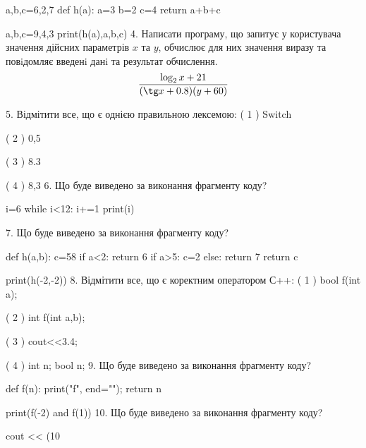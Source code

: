 \documentclass[11pt]{article}
\begin{document}
a,b,c=6,2,7
def h(a):
    a=3
    b=2
    c=4
    return a+b+c

a,b,c=9,4,3
print(h(a),a,b,c)
\vspace{5mm}
4. 
Написати програму, що запитує у користувача значення дійсних параметрів $x$ та $y$, обчислює для них значення виразу та повiдомляє введенi данi та результат обчислення.
$$\frac{\log_{2} x + 21}{(\tg x + 0.8) (y + 60)}$$ 

\vspace{5mm}
5. %
Відмітити все, що є однією правильною лексемою:
( 1 ) Switch

( 2 ) 0,5

( 3 ) 8.3

( 4 ) 8,3
\vspace{5mm}
6. Що буде виведено за виконання фрагменту коду?

i=6
while i<12:
    i+=1
print(i)

\vspace{5mm}
7. Що буде виведено за виконання фрагменту коду?

def h(a,b):
    c=58
    if a<2:
        return 6
    if a>5:
         c=2
    else: 
        return 7
    return c

print(h(-2,-2))
\vspace{5mm}
8. %
Відмітити все, що є коректним оператором С++:
( 1 ) bool f(int a);

( 2 ) int f(int a,b);

( 3 ) cout<<3.4;

( 4 ) int n; bool n;
\vspace{5mm}
9. Що буде виведено за виконання фрагменту коду?

def f(n):
    print("f", end="");
    return n

print(f(-2) and f(1))
\vspace{5mm}
10. Що буде виведено за виконання фрагменту коду?

cout << (10 %
\vspace{5mm}










\newpage

\newpage
\end{document}

